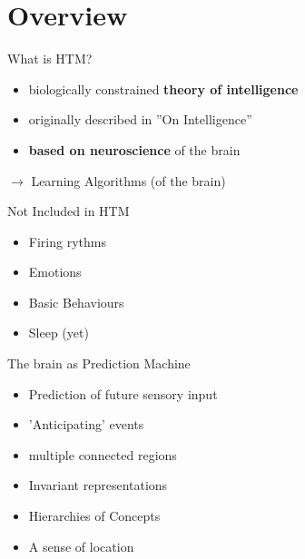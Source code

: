 \section{Overview}


\begin{frame}[c]{What is HTM?}
    \Large
    \begin{itemize}[<+(1)->]
        \item biologically constrained \textbf{theory of intelligence}
        \item originally described in ''On Intelligence''
        \item \textbf{based on neuroscience} of the brain
    \end{itemize}

    \vspace{0.5cm}

    \pause

    $\rightarrow$ Learning Algorithms \pause (of the brain)
\end{frame}




\begin{frame}[c]{Not Included in HTM}
    \Large
    \begin{itemize}[<+(1)->]
        \item Firing rythms
        \item Emotions
        \item Basic Behaviours
        \item Sleep (yet)
    \end{itemize}
\end{frame}


\begin{frame}[c]{The brain as Prediction Machine}
    \Large
    \begin{itemize}[<+(1)->]
        \item Prediction of future sensory input
        \item 'Anticipating' events
        \item multiple connected regions
        \item Invariant representations
        \item Hierarchies of Concepts
        \item A sense of location
    \end{itemize}
\end{frame}


